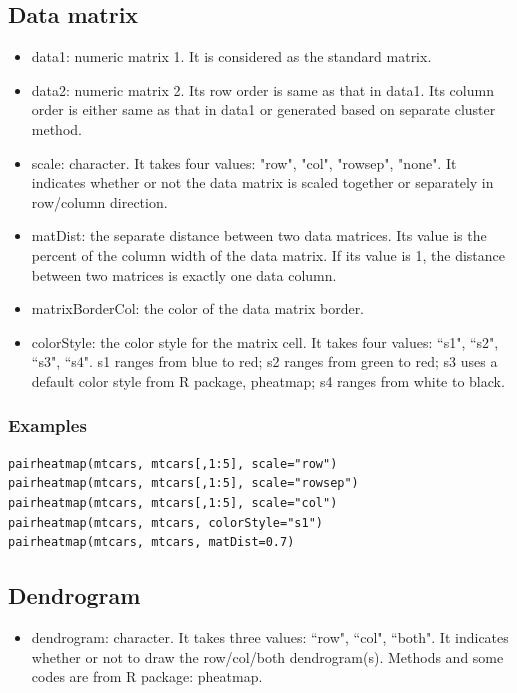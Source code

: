 \documentclass[a4paper]{article}
\begin{document}
\subsection{Data matrix}
\begin{itemize}
	\item data1: numeric matrix 1. It is considered as the standard matrix. 
	\item data2: numeric matrix 2. Its row order is same as that in data1. Its column order is either same as that in data1 or generated based on separate cluster method.	
	\item scale: character. It takes four values: "row", "col", "rowsep", "none". It indicates whether or not the data matrix is scaled together or separately in row/column direction. 
	\item matDist: the separate distance between two data matrices. Its value is the percent of the column width of the data matrix. If its value is 1, the distance between two matrices is exactly one data column.
	\item matrixBorderCol: the color of the data matrix border.
	\item colorStyle: the color style for the matrix cell. It takes four values: ``s1", ``s2", ``s3", ``s4". s1 ranges from blue to red; s2 ranges from green to red; s3 uses a default color style from R package, pheatmap; s4 ranges from white to black. 
\end{itemize}
\subsubsection{Examples}
\begin{verbatim}
pairheatmap(mtcars, mtcars[,1:5], scale="row")
pairheatmap(mtcars, mtcars[,1:5], scale="rowsep")
pairheatmap(mtcars, mtcars[,1:5], scale="col")
pairheatmap(mtcars, mtcars, colorStyle="s1")
pairheatmap(mtcars, mtcars, matDist=0.7)
\end{verbatim}
\subsection{Dendrogram}
\begin{itemize}
    \item dendrogram: character. It takes three values: ``row", ``col", ``both". It indicates whether or not to draw the row/col/both dendrogram(s). Methods and some codes are from R package: pheatmap.
\end{itemize}
\end{document}
